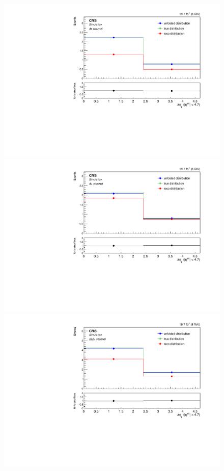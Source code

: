 \begin{figure}[hbtp]
\begin{center}
    \includegraphics[width=0.8\cmsFigWidth]{Figures/Unfolding/MCTests/Deta_ZZTo4e_PowMatrix_PowDistr_HalfSample_fr}     
    \includegraphics[width=0.8\cmsFigWidth]{Figures/Unfolding/MCTests/Deta_ZZTo4m_PowMatrix_PowDistr_HalfSample_fr}     
 \includegraphics[width=0.8\cmsFigWidth]{Figures/Unfolding/MCTests/Deta_ZZTo2e2m_PowMatrix_PowDistr_HalfSample_fr}        

\end{center}
\end{figure}

